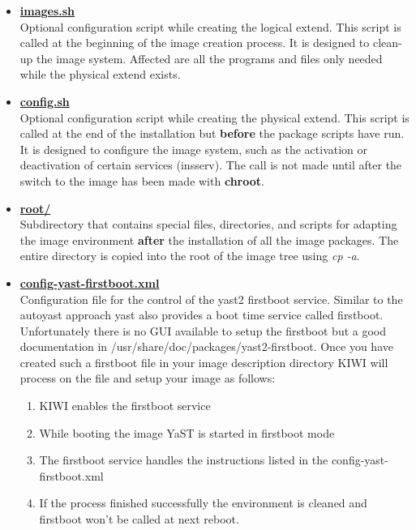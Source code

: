 \begin{itemize}
\item \textbf{\underline{images.sh}}\\
      Optional configuration script while creating the logical extend.
      This script is called at the beginning of the image creation process.
      It is designed to clean-up the image system. Affected are all the
      programs and files only needed while the physical extend exists.

\item \textbf{\underline{config.sh}}\\
      Optional configuration script while creating the physical extend. This
      script is called at the end of the installation but \textbf{before}
      the package scripts have run. It is designed to configure the image
      system, such as the activation or deactivation of certain services
      (insserv). The call is not made until after the switch to the image
      has been made with \textbf{chroot}.

\item \textbf{\underline{root/}}\\
      Subdirectory that contains special files, directories, and scripts for
      adapting the image environment \textbf{after} the installation of all the
      image packages. The entire directory is copied into the root of the
      image tree using \textit{cp -a}.

\item \textbf{\underline{config-yast-firstboot.xml}}\\
      Configuration file for the control of the yast2 firstboot service.
      Similar to the autoyast approach yast also provides a boot time
      service called firstboot. Unfortunately there is no GUI available
      to setup the firstboot but a good documentation in
      /usr/share/doc/packages/yast2-firstboot. Once you have 
      created such a firstboot file in your image description directory KIWI
      will process on the file and setup your image as follows:

      \begin{enumerate}
      \item KIWI enables the firstboot service
      \item While booting the image YaST is started in firstboot mode
      \item The firstboot service handles the instructions listed in the
            config-yast-firstboot.xml
      \item If the process finished successfully the environment is
            cleaned and firstboot won't be called at next reboot.
      \end{enumerate} 


\end{itemize}
